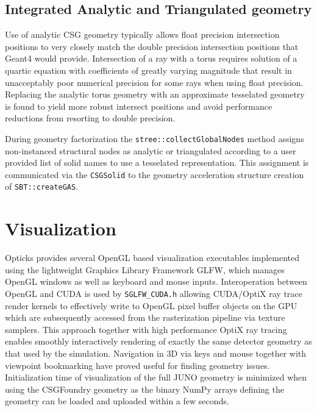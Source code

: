 \documentclass{webofc}
\begin{document}
\subsection{Integrated Analytic and Triangulated geometry}
Use of analytic CSG geometry typically allows float precision intersection 
positions to very closely match the double precision intersection positions 
that Geant4 would provide. 
Intersection of a ray with a torus requires solution of a quartic equation
with coefficients of greatly varying magnitude that result in unacceptably 
poor numerical precision for some rays when using float precision. 
Replacing the analytic torus geometry with an approximate
tesselated geometry is found to yield more robust intersect positions
and avoid performance reductions from resorting to double precision.  

During geometry factorization the {\tt stree::collectGlobalNodes} method
assigns non-instanced structural nodes as analytic or
triangulated according to a user provided list of solid names to use 
a tesselated representation. This assignment is communicated via the {\tt CSGSolid}     
to the geometry acceleration structure creation of {\tt SBT::createGAS}. 
%
%
%
%
\section{Visualization}%
%
Opticks provides several OpenGL based visualization executables 
implemented using the lightweight Graphics Library Framework GLFW,
which manages OpenGL windows as well as keyboard and mouse inputs. 
Interoperation between OpenGL and CUDA is used by {\tt SGLFW\_CUDA.h}
allowing CUDA/OptiX ray trace render kernels to effectively write to OpenGL 
pixel buffer objects on the GPU which are subsequently accessed from the 
rasterization pipeline via texture samplers. This approach together with
high performance OptiX ray tracing enables smoothly interactively rendering of 
exactly the same detector geometry as that used by the simulation. 
Navigation in 3D via keys and mouse together 
with viewpoint bookmarking have proved useful for finding geometry issues.      
Initialization time of visualization of the full JUNO geometry 
is minimized when using the CSGFoundry geometry as the binary NumPy arrays defining 
the geometry can be loaded and uploaded within a few seconds.  
\end{document}
